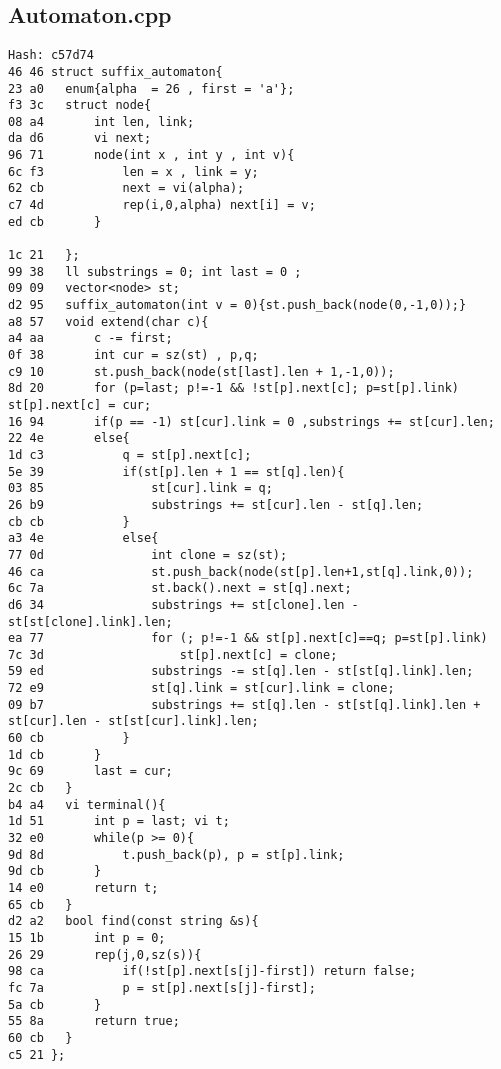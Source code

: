 \documentclass[11pt, a4paper, twoside]{article}
\begin{document}
\subsection{Automaton.cpp}
\begin{lstlisting}
Hash: c57d74
46 46 struct suffix_automaton{
23 a0 	enum{alpha  = 26 , first = 'a'};
f3 3c 	struct node{
08 a4 		int len, link;
da d6 		vi next;
96 71 		node(int x , int y , int v){
6c f3 			len = x , link = y;
62 cb 			next = vi(alpha);
c7 4d 			rep(i,0,alpha) next[i] = v;
ed cb 		}
      
1c 21 	};
99 38 	ll substrings = 0; int last = 0 ;
09 09 	vector<node> st; 
d2 95 	suffix_automaton(int v = 0){st.push_back(node(0,-1,0));}
a8 57 	void extend(char c){
a4 aa 		c -= first;
0f 38 		int cur = sz(st) , p,q;
c9 10 		st.push_back(node(st[last].len + 1,-1,0));
8d 20 	    for (p=last; p!=-1 && !st[p].next[c]; p=st[p].link) st[p].next[c] = cur;				
16 94 		if(p == -1) st[cur].link = 0 ,substrings += st[cur].len;
22 4e 		else{
1d c3 			q = st[p].next[c];
5e 39 			if(st[p].len + 1 == st[q].len){
03 85 				st[cur].link = q;
26 b9 				substrings += st[cur].len - st[q].len;
cb cb 			}
a3 4e 			else{
77 0d 				int clone = sz(st);
46 ca 				st.push_back(node(st[p].len+1,st[q].link,0));
6c 7a 				st.back().next = st[q].next;
d6 34 	            substrings += st[clone].len - st[st[clone].link].len;
ea 77 	            for (; p!=-1 && st[p].next[c]==q; p=st[p].link)
7c 3d 	                st[p].next[c] = clone;
59 ed 	            substrings -= st[q].len - st[st[q].link].len;
72 e9 	            st[q].link = st[cur].link = clone;
09 b7 	            substrings += st[q].len - st[st[q].link].len + st[cur].len - st[st[cur].link].len;
60 cb 			}
1d cb 		} 
9c 69 		last = cur;
2c cb 	}
b4 a4 	vi terminal(){
1d 51 		int p = last; vi t;
32 e0 		while(p >= 0){
9d 8d 			t.push_back(p), p = st[p].link;
9d cb 		}
14 e0 		return t;
65 cb 	}
d2 a2 	bool find(const string &s){
15 1b 		int p = 0;
26 29 		rep(j,0,sz(s)){
98 ca 			if(!st[p].next[s[j]-first]) return false;
fc 7a 			p = st[p].next[s[j]-first];
5a cb 		}
55 8a 		return true;
60 cb 	}
c5 21 };
\end{lstlisting}
\end{document}
